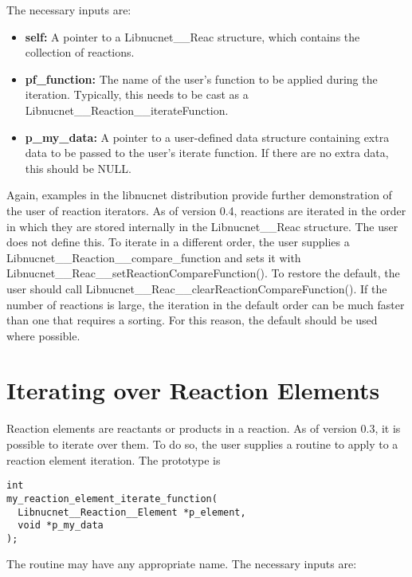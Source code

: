 \documentclass{article}    %
\begin{document}
\noindent
The necessary inputs are:

\begin{itemize}

\item {\bf self:} A pointer to a Libnucnet\_\_Reac structure, which contains
the collection of reactions.

\item {\bf pf\_function:} The name of the user's function to be applied
during the iteration.
Typically, this needs to be cast as a
Libnucnet\_\_Reaction\_\_iterateFunction.

\item {\bf p\_my\_data:}  A pointer to a user-defined data structure containing
extra data to be passed to the user's iterate function.  If there are
no extra data, this should be NULL.

\end{itemize}

Again, examples in the libnucnet distribution provide further demonstration of
the user of reaction iterators.  As of version 0.4, reactions are iterated
in the order in which they are stored internally in the Libnucnet\_\_Reac
structure.  The user does not define this.  To iterate in a different order,
the user supplies a Libnucnet\_\_Reaction\_\_compare\_function and sets it
with Libnucnet\_\_Reac\_\_setReactionCompareFunction().  To restore the
default, the user should call
Libnucnet\_\_Reac\_\_clearReactionCompareFunction().
If the number of reactions is large, the iteration in the default order can be
much faster than one that requires a sorting.  For this reason, the default
should be used where possible.

\section{Iterating over Reaction Elements} 

Reaction elements are reactants or products in a reaction.  As of version
0.3, it is possible to iterate over them.  To do so,
the user supplies a routine to apply to a
reaction element iteration.  The prototype is

\begin{verbatim}
int
my_reaction_element_iterate_function(
  Libnucnet__Reaction__Element *p_element,
  void *p_my_data
);
\end{verbatim}

\noindent The routine may have any appropriate name.  The necessary inputs are:
\end{document}
